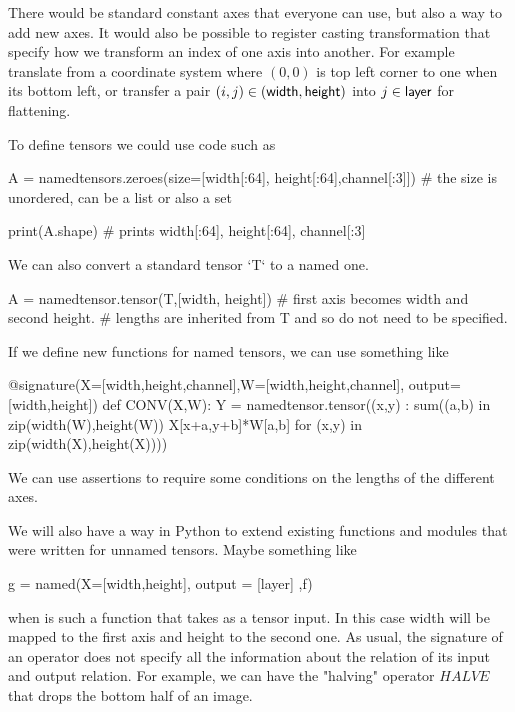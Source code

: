 \documentclass{article}
\begin{document}
There would be standard constant axes that everyone can use, but also a way to add new axes.
It would also be possible to register casting transformation that specify how we transform an index of one axis into another. For example translate from a coordinate system where $(0,0)$ is top left corner to one when its bottom left, or transfer a pair $(i,j) \in (\mathsf{width},\mathsf{height})$ into $j \in \mathsf{layer}$ for flattening.

To define tensors we could use code such as 

\begin{python}
A = namedtensors.zeroes(size=[width[:64], height[:64],channel[:3]])
# the size is unordered, can be a list or also a set

print(A.shape)
# prints { width[:64], height[:64], channel[:3] }
\end{python}

We can also convert a standard  tensor `T` to a named one.
 
\begin{python}
A = namedtensor.tensor(T,[width, height]) 
# first axis becomes width and second height.
# lengths are inherited from T and so do not need to be specified.
\end{python}


If we define new functions for named tensors, we can use something like

\begin{python}
  @signature(X=[width,height,channel],W=[width,height,channel], output=[width,height])
  def CONV(X,W):
      Y = namedtensor.tensor({(x,y) : sum((a,b) in zip(width(W),height(W)) X[x+a,y+b]*W[a,b]} for (x,y) in zip(width(X),height(X))))  
\end{python}
We can use assertions to require some conditions on the lengths of the different axes.



We will also have a way in Python to extend existing functions and modules that were written for unnamed tensors.
Maybe something like

\begin{python}
g = named(X=[width,height], output = [layer] ,f)
\end{python}
when  is such a function that takes  as a tensor input. In this case width will be mapped to the first axis and height to the second one. 
As usual, the signature of an operator does not specify all the information about the relation of its input and output relation. For example, we can have the "halving" operator $HALVE$ that drops the bottom half of an image.
\end{document}
